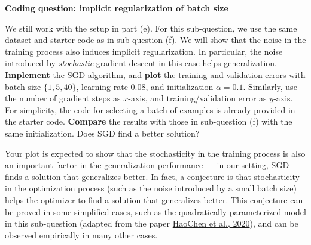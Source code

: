 \item{}\textbf{} \textbf{Coding question: implicit regularization of batch size}

We still work with the setup in part (e). For this sub-question, we use the same dataset and starter code as in sub-question (f). We will show that the noise in the training process also induces implicit regularization. In particular, the noise introduced by \emph{stochastic} gradient descent in this case helps generalization. \textbf{Implement} the SGD algorithm, and \textbf{plot} the training and validation errors with batch size $\{1, 5, 40\}$, learning rate $0.08$, and initialization $\alpha=0.1$. Similarly, use the number of gradient steps as $x$-axis, and training/validation error as $y$-axis. For simplicity, the code for selecting a batch of examples is already provided in the starter code.
\textbf{Compare} the results with those in sub-question (f) with the same initialization. Does SGD find a better solution?

Your plot is expected to show that the stochasticity in the training process is also an important factor in the generalization performance --- in our setting, SGD finds a solution that generalizes better. In fact, a conjecture is that stochasticity in the optimization process (such as the noise introduced by a small batch size) helps the optimizer to find a solution that generalizes better. This conjecture can be proved in some simplified cases, such as the quadratically parameterized model in this sub-question (adapted from the paper \href{https://arxiv.org/abs/2006.08680}{HaoChen et al., 2020}), and can be observed empirically in many other cases.